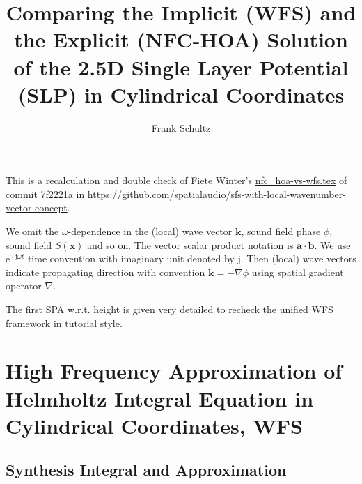 \documentclass[a4paper,BCOR=15mm,10pt,twoside]{scrartcl}
\title{Comparing the Implicit (WFS) and the Explicit (NFC-HOA) Solution of the 
2.5D Single Layer Potential (SLP) in Cylindrical Coordinates}
\author{Frank Schultz}
\newcommand\e{\mathrm{e}}  %
\newcommand\im{\mathrm{j}}  %
\renewcommand{\vec}[1]{\mathbf{#1}}  %
\begin{document}
\maketitle
%
This is a recalculation and double check of Fiete Winter's \url{nfc_hoa-vs-wfs.tex} of commit \url{7f2221a} in \url{https://github.com/spatialaudio/sfs-with-local-wavenumber-vector-concept}.

We omit the $\omega$-dependence in the (local) wave vector $\vec{k}$, sound field phase $\phi$, sound field $S(\vec{x})$ and so on. The vector scalar product notation is $\vec{a} \cdot \vec{b}$.
%
We use $\e^{+\im \omega t}$ time convention with imaginary unit denoted by $\im$.
%
Then (local) wave vectors indicate propagating direction with convention $\vec{k} = - \nabla \phi$ using spatial gradient operator $\nabla$.

The first SPA w.r.t. height is given very detailed to recheck the unified WFS framework in tutorial style.

\section{High Frequency Approximation of Helmholtz Integral Equation in Cylindrical Coordinates, WFS}

\subsection{Synthesis Integral and Approximation}
\end{document}

